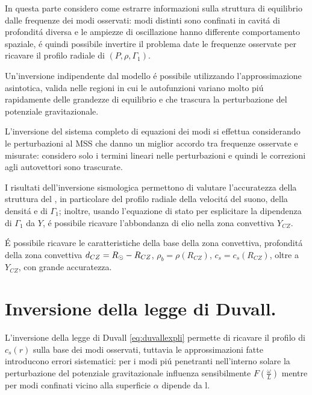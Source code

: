 \documentclass[../main.tex]{subfiles}
\begin{document}
In questa parte considero come estrarre informazioni sulla struttura di equilibrio dalle frequenze dei modi osservati: modi distinti sono confinati in cavit\'a di profondit\'a diversa e le ampiezze di oscillazione hanno differente comportamento spaziale, \'e quindi possibile invertire il problema date le frequenze osservate per ricavare il profilo radiale di $(P,\rho,\Gamma_1)$.

Un'inversione indipendente dal modello \'e possibile utilizzando l'approssimazione asintotica, valida nelle regioni in cui le autofunzioni variano molto pi\'u rapidamente delle grandezze di equilibrio e che trascura la perturbazione del potenziale gravitazionale.
 
L'inversione del sistema completo di equazioni dei modi si effettua considerando le perturbazioni al MSS che danno un miglior accordo tra frequenze osservate e misurate: considero solo i termini lineari nelle perturbazioni e quindi le correzioni agli autovettori sono trascurate.

I risultati dell'inversione sismologica permettono di valutare l'accuratezza della struttura del \mss{} , in particolare del profilo radiale della velocit\'a del suono, della densit\'a e di $\Gamma_1$; inoltre, usando l'equazione di stato per esplicitare la dipendenza di $\Gamma_1$ da $Y$, \'e possibile ricavare l'abbondanza di elio nella zona convettiva $Y_{CZ}$.

\'E possibile ricavare le caratteristiche della base della zona convettiva, profondit\'a della zona convettiva $d_{CZ}=R_{\odot}{}-R_{CZ}$, $\rho_b=\rho(R_{CZ})$, $c_s=c_s(R_{CZ})$, oltre a $Y_{CZ}$, con grande accuratezza.


{\let\clearpage\relax\let\cleardoublepage\relax \chapter{Inversione della legge di Duvall.}} %



L'inversione della legge di Duvall \eqref{eq:duvallexpli} permette di ricavare il profilo di $c_s(r)$ sulla base dei modi osservati, tuttavia le approssimazioni fatte introducono errori sistematici: per i modi pi\'u penetranti nell'interno solare la perturbazione del potenziale gravitazionale influenza sensibilmente $F(\frac{\omega}{L})$ mentre per modi confinati vicino alla superficie $\alpha$ dipende da l.
\end{document}

